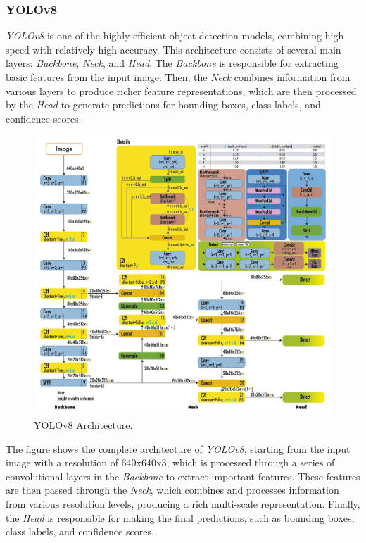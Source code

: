 \vspace{5pt}
\subsubsection{YOLOv8}
\label{subsubsec:YOLOv8}

\emph{YOLOv8} is one of the highly efficient object detection models, combining high speed with relatively high accuracy. This architecture consists of several main layers: \emph{Backbone}, \emph{Neck}, and \emph{Head}. The \emph{Backbone} is responsible for extracting basic features from the input image. Then, the \emph{Neck} combines information from various layers to produce richer feature representations, which are then processed by the \emph{Head} to generate predictions for bounding boxes, class labels, and confidence scores.

\begin{figure}[H] 
  \centering 
  \includegraphics[scale=0.45]{gambar/YoloV8Architecture.jpg} 
  \caption{YOLOv8 Architecture.} 
  \label{fig:YOLOv8Architecture} 
\end{figure}

The figure shows the complete architecture of \emph{YOLOv8}, starting from the input image with a resolution of 640x640x3, which is processed through a series of convolutional layers in the \emph{Backbone} to extract important features. These features are then passed through the \emph{Neck}, which combines and processes information from various resolution levels, producing a rich multi-scale representation. Finally, the \emph{Head} is responsible for making the final predictions, such as bounding boxes, class labels, and confidence scores.


